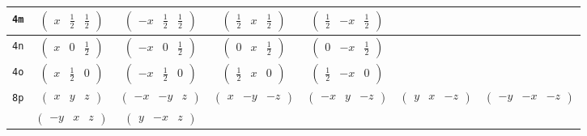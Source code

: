 \documentclass[fleqn,9pt,landscape]{jsarticle}
\begin{document}
\begin{center}
\begin{longtable}{ccccccc}
{\tt 4m} & $ \begin{pmatrix} x & \frac{1}{2} & \frac{1}{2} \end{pmatrix} $ & $ \begin{pmatrix} - x & \frac{1}{2} & \frac{1}{2} \end{pmatrix} $ & $ \begin{pmatrix} \frac{1}{2} & x & \frac{1}{2} \end{pmatrix} $ & $ \begin{pmatrix} \frac{1}{2} & - x & \frac{1}{2} \end{pmatrix} $ & $  $ & $  $ \\ \hline
{\tt 4n} & $ \begin{pmatrix} x & 0 & \frac{1}{2} \end{pmatrix} $ & $ \begin{pmatrix} - x & 0 & \frac{1}{2} \end{pmatrix} $ & $ \begin{pmatrix} 0 & x & \frac{1}{2} \end{pmatrix} $ & $ \begin{pmatrix} 0 & - x & \frac{1}{2} \end{pmatrix} $ & $  $ & $  $ \\ \hline
{\tt 4o} & $ \begin{pmatrix} x & \frac{1}{2} & 0 \end{pmatrix} $ & $ \begin{pmatrix} - x & \frac{1}{2} & 0 \end{pmatrix} $ & $ \begin{pmatrix} \frac{1}{2} & x & 0 \end{pmatrix} $ & $ \begin{pmatrix} \frac{1}{2} & - x & 0 \end{pmatrix} $ & $  $ & $  $ \\ \hline
{\tt 8p} & $ \begin{pmatrix} x & y & z \end{pmatrix} $ & $ \begin{pmatrix} - x & - y & z \end{pmatrix} $ & $ \begin{pmatrix} x & - y & - z \end{pmatrix} $ & $ \begin{pmatrix} - x & y & - z \end{pmatrix} $ & $ \begin{pmatrix} y & x & - z \end{pmatrix} $ & $ \begin{pmatrix} - y & - x & - z \end{pmatrix} $ \\
& $ \begin{pmatrix} - y & x & z \end{pmatrix} $ & $ \begin{pmatrix} y & - x & z \end{pmatrix} $ & $  $ & $  $ & $  $ & $  $ \\
\end{longtable}
\end{center}
\end{document}
